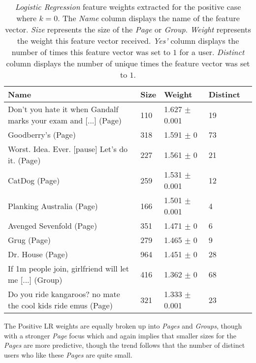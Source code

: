 \begin{table}[h]
\begin{minipage}[b]{1.0\textwidth}
\centering
  \begin{tabular}{|l|l|l|l|l|} %
  \hline
  \textbf{Name} & \textbf{Size} & \textbf{Weight} & \textbf{Distinct} \\ \hline

Don't you hate it when Gandalf marks your exam and [...] (Page) & 110 & 1.627 $\pm$ 0.001 & 19 \\ \hline
Goodberry's (Page) & 318 & 1.591 $\pm$ 0 & 73 \\ \hline
Worst. Idea. Ever. [pause] Let's do it. (Page) & 227 & 1.561 $\pm$ 0 & 21 \\ \hline
CatDog (Page) & 259 & 1.531 $\pm$ 0.001 & 12 \\ \hline
Planking Australia (Page) & 166 & 1.501 $\pm$ 0.001 & 4 \\ \hline
Avenged Sevenfold (Page) & 351 & 1.471 $\pm$ 0 & 6 \\ \hline
Grug (Page) & 279 & 1.465 $\pm$ 0 & 9 \\ \hline
Dr. House (Page) & 964 & 1.451 $\pm$ 0 & 28 \\ \hline
If 1m people join, girlfriend will let me [...] (Group) & 416 & 1.362 $\pm$ 0 & 68 \\ \hline
Do you ride kangaroos? no mate the cool kids ride emus (Page) & 321 & 1.333 $\pm$ 0.001 & 23 \\ \hline
  \end{tabular}
  \caption{\emph{Logistic Regression} feature weights extracted for the positive case where $k=0$. The \emph{Name} column displays the name of the feature vector.
                        \emph{Size} represents the size of the \emph{Page} or \emph{Group}.
                        \emph{Weight} represents the weight this feature vector received.  
                        \emph{Yes'} column displays the number of times this feature vector was set to $1$ for a user.
                        \emph{Distinct} column displays the number of unique times the feature vector was set to $1$.}
\end{minipage}
\end{table}

The Positive LR weights are equally broken up into \emph{Pages} and \emph{Groups}, though with a stronger \emph{Page} focus which and again 
implies that smaller sizes for the \emph{Pages} are more predictive, though the trend follows that the number of distinct users who like these 
\emph{Pages} are quite small.


